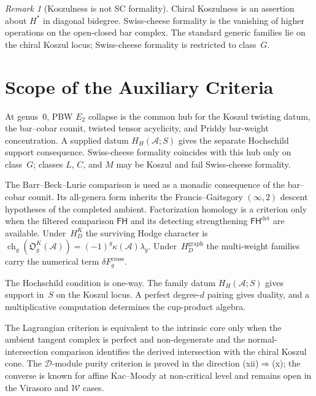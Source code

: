 \documentclass[11pt,reqno]{amsart}
\theoremstyle{definition}
\theoremstyle{remark}
\newtheorem{remark}[theorem]{Remark}
\newcommand{\cA}{\mathcal{A}}
\newcommand{\cD}{\mathcal{D}}
\newcommand{\cW}{\mathcal{W}}
\numberwithin{equation}{section}
\begin{document}
\begin{remark}[Koszulness is not SC formality]
Chiral Koszulness is an assertion about $H^*$ in diagonal
bidegree. Swiss-cheese formality is the vanishing of higher
operations on the open-closed bar complex. The standard generic
families lie on the chiral Koszul locus; Swiss-cheese formality is
restricted to class~$G$.
\end{remark}

\appendix
\section{Scope of the Auxiliary Criteria}
\label{sec:n1-scope}

At genus~$0$, PBW $E_2$ collapse is the common hub for the Koszul
twisting datum, the bar--cobar counit, twisted tensor acyclicity,
and Priddy bar-weight concentration.  A supplied datum
$H_H(\cA;S)$ gives the separate Hochschild support consequence.
Swiss-cheese formality coincides with this hub only
on class~$G$; classes $L$, $C$, and $M$ may be Koszul and fail
Swiss-cheese formality.

The Barr--Beck--Lurie comparison is used as a monadic consequence
of the bar--cobar counit. Its all-genera form inherits the
Francis--Gaitsgory $(\infty,2)$ descent hypotheses of the completed
ambient. Factorization homology is a criterion only when the
filtered comparison $\mathsf{FH}$ and its detecting strengthening
$\mathsf{FH}^{\mathrm{det}}$ are available.  Under~$H_D^K$ the
surviving Hodge character is
$\operatorname{ch}_g(\mathfrak O_g^K(\cA))
=(-1)^g\kappa(\cA)\lambda_g$.  Under~$H_D^{\mathrm{graph}}$ the
multi-weight families carry the numerical term
$\delta F_g^{\mathrm{cross}}$.

The Hochschild condition is one-way.  The family datum
$H_H(\cA;S)$ gives support in~$S$ on the Koszul locus.  A perfect
degree-$d$ pairing gives duality, and a multiplicative computation
determines the cup-product algebra.

The Lagrangian criterion is equivalent to the intrinsic core only
when the ambient tangent complex is perfect and non-degenerate and
the normal-intersection comparison identifies the derived
intersection with the chiral Koszul cone. The $\cD$-module purity
criterion is proved in the direction
\textup{(xii)}$\Rightarrow$\textup{(x)}; the converse is known for
affine Kac--Moody at non-critical level and remains open in the
Virasoro and $\cW$ cases.
\end{document}
